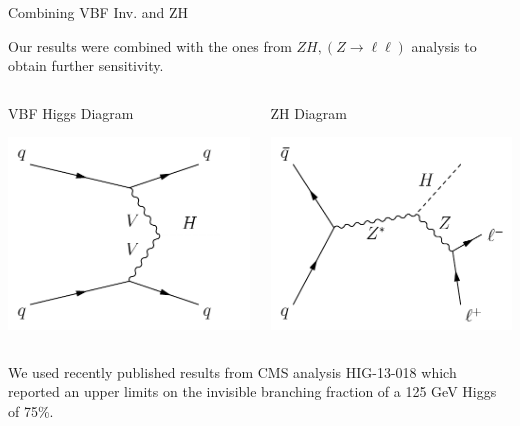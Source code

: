 \documentclass[8pt]{beamer}
\begin{document}
\begin{frame}{Combining VBF Inv. and ZH}
 
Our results were combined with the ones from $ZH, (Z \rightarrow \ell\ell)$  analysis to obtain further sensitivity.
 
\begin{columns}
 
\begin{block}{VBF Higgs Diagram}
 
\centering
\includegraphics[width=0.8\linewidth]{img/feyn_VBF.pdf} 

\end{block}

\begin{block}{ZH Diagram}
 
\centering
\includegraphics[width=0.8\linewidth]{img/feyn_Zll.pdf} 

\end{block}

\end{columns}

We used recently published results from CMS analysis  HIG-13-018 which reported an upper limits on the invisible branching fraction of a 125 GeV Higgs of 75\%.

\end{frame}
\end{document}
